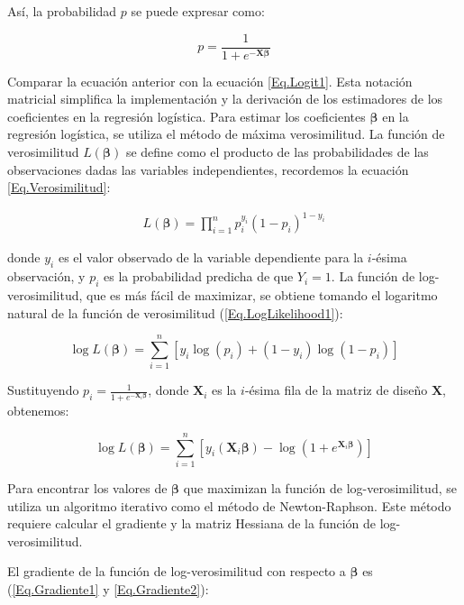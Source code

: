 \documentclass[a4paper]{report} %
\begin{document}
Así, la probabilidad $p$ se puede expresar como:

\begin{equation}\label{Eq.Logit2}
p = \frac{1}{1 + e^{-\mathbf{X} \boldsymbol{\beta}}}
\end{equation}

Comparar la ecuaci\'on anterior con la ecuaci\'on \ref{Eq.Logit1}. Esta notación matricial simplifica la implementación y la derivación de los estimadores de los coeficientes en la regresión logística. Para estimar los coeficientes $\boldsymbol{\beta}$ en la regresión logística, se utiliza el método de máxima verosimilitud. La función de verosimilitud $L(\boldsymbol{\beta})$ se define como el producto de las probabilidades de las observaciones dadas las variables independientes, recordemos la ecuaci\'on \ref{Eq.Verosimilitud}:

\begin{eqnarray}
L(\boldsymbol{\beta}) = \prod_{i=1}^{n} p_i^{y_i} (1 - p_i)^{1 - y_i}
\end{eqnarray}


donde $y_i$ es el valor observado de la variable dependiente para la $i$-ésima observación, y $p_i$ es la probabilidad predicha de que $Y_i = 1$.  La función de log-verosimilitud, que es más fácil de maximizar, se obtiene tomando el logaritmo natural de la función de verosimilitud (\ref{Eq.LogLikelihood1}):

\begin{equation}
\log L(\boldsymbol{\beta}) = \sum_{i=1}^{n} \left[ y_i \log(p_i) + (1 - y_i) \log(1 - p_i) \right]
\end{equation}

Sustituyendo $p_i = \frac{1}{1 + e^{-\mathbf{X}_i \boldsymbol{\beta}}}$, donde $\mathbf{X}_i$ es la $i$-ésima fila de la matriz de diseño $\mathbf{X}$, obtenemos:

\begin{equation}\label{Eq.LogLikelihood2}
\log L(\boldsymbol{\beta}) = \sum_{i=1}^{n} \left[ y_i (\mathbf{X}_i \boldsymbol{\beta}) - \log(1 + e^{\mathbf{X}_i \boldsymbol{\beta}}) \right]
\end{equation}

Para encontrar los valores de $\boldsymbol{\beta}$ que maximizan la función de log-verosimilitud, se utiliza un algoritmo iterativo como el método de Newton-Raphson. Este método requiere calcular el gradiente y la matriz Hessiana de la función de log-verosimilitud.


El gradiente de la función de log-verosimilitud con respecto a $\boldsymbol{\beta}$ es (\ref{Eq.Gradiente1} y \ref{Eq.Gradiente2}):
\end{document}
